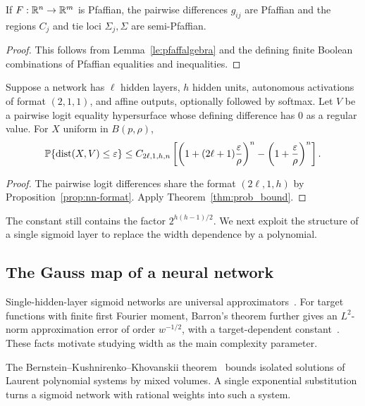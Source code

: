 \begin{proposition}\label{prop:decision-pfaffian}
If $F:\mathbb{R}^n\to\mathbb{R}^m$ is Pfaffian, the pairwise differences $g_{ij}$ are Pfaffian and the regions $C_j$ and tie loci $\Sigma_j,\Sigma$ are semi-Pfaffian.
\end{proposition}

\begin{proof}
This follows from Lemma~\ref{le:pfaffalgebra} and the defining finite Boolean combinations of Pfaffian equalities and inequalities.
\end{proof}

\begin{corollary}\label{cor:nn-pfaff-tube}
Suppose a network has $\ell$ hidden layers, $h$ hidden units, autonomous activations of format $(2,1,1)$, and affine outputs, optionally followed by softmax. Let $V$ be a pairwise logit equality hypersurface whose defining difference has $0$ as a regular value. For $X$ uniform in $B(p,\rho)$,
\[
\operatorname*{\mathbb{P}}\{\operatorname{dist}(X,V)\le\varepsilon\}
\le C_{2\ell,1,h,n}
\left[\left(1+(2\ell+1)\frac{\varepsilon}{\rho}\right)^n
-\left(1+\frac{\varepsilon}{\rho}\right)^n\right].
\]
\end{corollary}

\begin{proof}
The pairwise logit differences share the format $(2\ell,1,h)$ by Proposition~\ref{prop:nn-format}. Apply Theorem~\ref{thm:prob_bound}.
\end{proof}

The constant still contains the factor $2^{h(h-1)/2}$. We next exploit the structure of a single sigmoid layer to replace the width dependence by a polynomial.

\subsection{The Gauss map of a neural network}
Single-hidden-layer sigmoid networks are universal approximators~\cite{cybenko1989approximation,hornik1989multilayer}. For target functions with finite first Fourier moment, Barron's theorem further gives an $L^2$-norm approximation error of order $w^{-1/2}$, with a target-dependent constant~\cite{barron1993universal}. These facts motivate studying width as the main complexity parameter.

The Bernstein--Kushnirenko--Khovanskii theorem~\cite{bernstein1975,cox2005using} bounds isolated solutions of Laurent polynomial systems by mixed volumes. A single exponential substitution turns a sigmoid network with rational weights into such a system.

